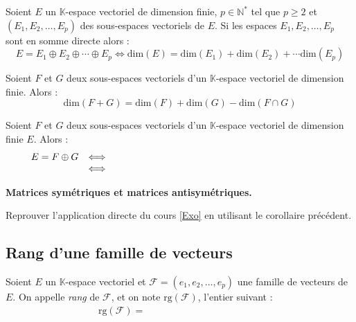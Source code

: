 \documentclass[a4paper,10pt]{report}
\begin{document}
\begin{cor} Soient $E$ un $\mathbb{K}$-espace vectoriel de dimension finie, $p \in \mathbb{N}^*$ tel que $p \geq 2$ et $(E_1, E_2, \ldots, E_p)$ des sous-espaces vectoriels de $E$. Si les espaces $E_1, E_2, \ldots, E_p$ sont en somme directe alors :
$$ E = E_1 \oplus E_2 \oplus \cdots \oplus E_p \Longleftrightarrow  \textrm{dim}(E) = \textrm{dim}(E_1) + \textrm{dim}(E_2) + \cdots \textrm{dim}(E_p)$$
\end{cor}


\begin{prop} Soient $F$ et $G$ deux sous-espaces vectoriels d'un $\mathbb{K}$-espace vectoriel de dimension finie. Alors :
$$ \textrm{dim}(F+G) = \textrm{dim}(F) + \textrm{dim}(G) - \textrm{dim}( F \cap G)$$
\end{prop}

\begin{cor} Soient $F$ et $G$ deux sous-espaces vectoriels d'un $\mathbb{K}$-espace vectoriel de dimension finie $E$. Alors :
$$ \begin{array}{ccl}
E = F \oplus G & \Longleftrightarrow & \phantom{\dis  F \cap G = \lbrace 0_E \rbrace \hbox{ et } \textrm{dim}(E) = \textrm{dim}(F) + \textrm{dim}(G)} \\
& \Longleftrightarrow & \phantom{\dis  F + G = E  \hbox{ et } \textrm{dim}(E) = \textrm{dim}(F) + \textrm{dim}(G)} \\
\end{array}$$
\end{cor}

\begin{ex} \textbf{Matrices symétriques et matrices antisymétriques.}
\end{ex}

\vspace{14cm}
\begin{exa} Reprouver l'application directe du cours \ref{Exo} en utilisant le corollaire précédent.
\end{exa}

\subsection{Rang d'une famille de vecteurs}

\begin{defin} Soient $E$ un $\mathbb{K}$-espace vectoriel et $\mathcal{F} = (e_1, e_2, \ldots, e_p)$ une famille de vecteurs de $E$. On appelle \textit{rang} de $\mathcal{F}$, et on note $\textrm{rg}(\mathcal{F})$, l'entier suivant :
$$ \textrm{rg}(\mathcal{F}) = \phantom{\textrm{dim}(\textrm{Vect}(e_1, e_2, \ldots, e_p))}$$
\end{defin}
\end{document}
